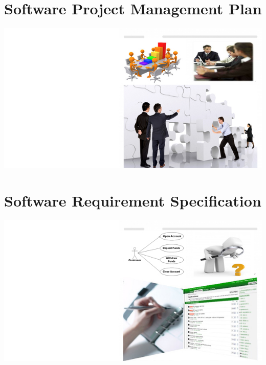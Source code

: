 \documentclass[12pt,a4paper,twoside]{report}
\begin{document}
\cleardoublepage
\chapter{Software Project Management Plan\label{spmp}}
\vspace{6cm}
\includegraphics[width=1\textwidth]{../comon/figures/spmpPic.jpg}



\cleardoublepage


\cleardoublepage
\chapter{Software Requirement Specification\label{srs}}
\vspace{6cm}
\includegraphics[width=1\textwidth]{../comon/figures/srsPic.jpg}
\cleardoublepage


\cleardoublepage
\end{document}
